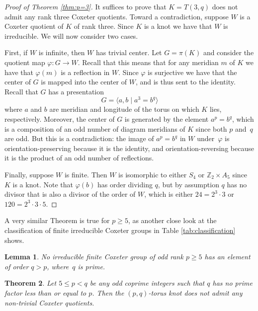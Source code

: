 \documentclass{article}
\newtheorem{theorem}{Theorem}[section]
\newtheorem{lemma}[theorem]{Lemma}
\theoremstyle{definition}
\begin{document}
\begin{proof}[Proof of Theorem \ref{thm:p=3}]
It suffices to prove that $K = T(3, q)$ does not admit any rank three Coxeter quotients. Toward a contradiction, suppose $W$ is a Coxeter quotient of $K$ of rank three. Since $K$ is a knot we have that $W$ is irreducible. We will now consider two cases.

First, if $W$ is infinite, then $W$ has trivial center. Let $G = \pi(K)$ and consider the quotient map $\varphi: G \rightarrow W$. Recall that this means that for any meridian $m$ of $K$ we have that $\varphi(m)$ is a reflection in $W$. Since $\varphi$ is surjective we have that the center of $G$ is mapped into the center of $W$, and is thus sent to the identity. Recall that $G$ has a presentation
$$G = \langle a, b \; | \; a^3 = b^q \rangle$$
where $a$ and $b$ are meridian and longitude of the torus on which $K$ lies, respectively. Moreover, the center of $G$ is generated by the element $a^p = b^q$, which is a composition of an odd number of diagram meridians of $K$ since both $p$ and~$q$ are odd. But this is a contradiction: the image of $a^p = b^q$ in $W$ under~$\varphi$ is orientation-preserving because it is the identity, and orientation-reversing because it is the product of an odd number of reflections.

Finally, suppose $W$ is finite. Then $W$ is isomorphic to either $S_4$ or $\mathbb{Z}_2 \times A_5$ since $K$ is a knot. Note that $\varphi(b)$ has order dividing $q$, but by assumption $q$ has no divisor that is also a divisor of the order of $W$, which is either $24 = 2^3 \cdot 3$ or $120 = 2^3 \cdot 3 \cdot 5$.
\end{proof}

A very similar Theorem is true for $p \geq 5$, as another close look at the classification of finite irreducible Coxeter groups in Table \ref{tab:classification} shows.

\begin{lemma}
No irreducible finite Coxeter group of odd rank $p \geq 5$ has an element of order $q > p$, where~$q$ is prime.
\end{lemma}

\begin{theorem}
Let $5 \leq p < q$ be any odd coprime integers such that $q$ has no prime factor less than or equal to $p$. Then the $(p, q)$-torus knot does not admit any non-trivial Coxeter quotients.
\end{theorem}
\end{document}
